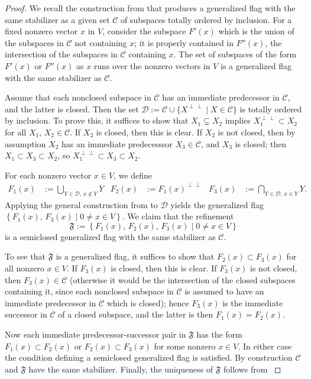 \documentclass{amsart}
\theoremstyle{definition}
\theoremstyle{remark}
\numberwithin{equation}{section}
\def\F{\mathfrak{F}}
\def\Ch{\mathcal{C}}
\def\Dh{\mathcal{D}}
\begin{document}
\begin{proof}
We recall the construction from \cite{DimitrovP1} that produces a generalized flag with the same stabilizer as a given set $\Ch$ of subspaces totally ordered by inclusion.  For a fixed nonzero vector $x$ in $V$, consider the subspace $F'(x)$ which is the union of the subspaces in $\Ch$ not containing $x$; it is properly contained in $F''(x)$, the intersection of the subspaces in $\Ch$ containing $x$.  The set of subspaces of the form $F'(x)$ or $F''(x)$ as $x$ runs over the nonzero vectors in $V$ is a generalized flag with the same stabilizer as $\Ch$.

Assume that each nonclosed subspace in $\Ch$ has an immediate predecessor in $\Ch$, and the latter is closed.  Then the set $\Dh := \Ch \cup \{ X^{\perp \perp} \mid X \in \Ch \}$ is totally ordered by inclusion.  To prove this, it suffices to show that $X_1 \subsetneq X_2$ implies $X_1^{\perp \perp} \subset X_2$ for all $X_1$, $X_2 \in \Ch$.  If $X_2$ is closed, then this is clear.  If $X_2$ is not closed, then by assumption $X_2$ has an immediate predecesssor $X_3 \in \Ch$, and $X_3$ is closed;  then $X_1 \subset X_3 \subset X_2$, so $X_1^{\perp \perp} \subset X_3 \subset X_2$.

For each nonzero vector $x \in V$, we define 
\begin{align*}
F_1(x) & :=  \bigcup_{Y \in \Dh, \, x \notin Y} Y &
F_2 (x) &:= F_1(x)^{\perp \perp} &
F_3 (x) & :=  \bigcap_{Y \in \Dh, \, x \in Y} Y .
\end{align*}
Applying the general construction from \cite{DimitrovP1} to $\Dh$ yields the generalized flag
$ \left\{ F_1(x), \, F_3(x)  \mid 0 \neq x \in V \right\}$.
We claim that the refinement $$\F := \left\{ F_1(x), \, F_2(x) , \, F_3(x)  \mid 0 \neq x \in V \right\}$$
is a semiclosed generalized flag with the same stabilizer as $\Ch$.

To see that $\F$ is a generalized flag, it suffices to show that $F_2 (x) \subset F_3(x)$ for all nonzero $x \in V$.  If $F_3 (x)$ is closed, then this is clear.  If $F_3 (x)$ is not closed, then $F_3(x) \in \Ch$ (otherwise it would be the intersection of the closed subspaces containing it, since each nonclosed subspace in $\Ch$ is assumed to have an immediate predecessor in $\Ch$ which is closed); hence $F_3(x)$ is the immediate successor in $\Ch$ of a closed subspace, and the latter is then $F_1 (x) = F_2 (x)$.

Now each immediate predecessor-successor pair in $\F$ has the form $F_1 (x) \subset F_2(x)$ or $F_2(x) \subset F_3(x)$ for some nonzero $x \in V$.  In either case the condition defining a semiclosed generalized flag is satisfied.  By construction $\Ch$ and $\F$ have the same stabilizer.  Finally, the uniqueness of $\F$ follows from \cite[Proposition 3.8]{DP}
\end{proof}
\end{document}
